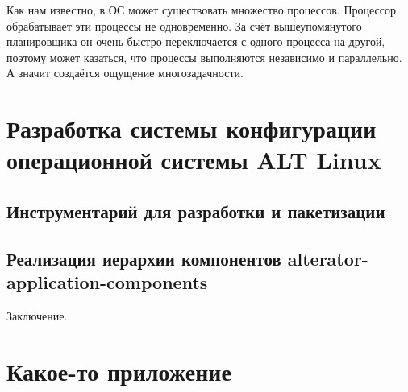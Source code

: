 \documentclass[bachelor, och, pract]{SCWorks}
\begin{document}
Как нам известно, в ОС может существовать множество процессов.
Процессор обрабатывает эти процессы не одновременно.
За счёт вышеупомянутого планировщика он очень быстро переключается с одного процесса на другой, поэтому может казаться, что процессы выполняются независимо и параллельно.
А значит создаётся ощущение многозадачности.

\newpage

\section{Разработка системы конфигурации операционной системы ALT Linux}

\subsection{Инструментарий для разработки и пакетизации}

\subsection{Реализация иерархии компонентов alterator-application-components}

\newpage

\conclusion
Заключение.

%

%



\appendix

\section{Какое-то приложение}
\end{document}
